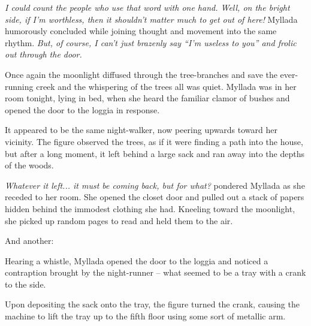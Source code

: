 \emph{I could count the people who use that word with one hand. Well, on the bright side, if I'm worthless, then it shouldn't matter much to get out of here!} Myllada humorously concluded while joining thought and movement into the same rhythm. \emph{But, of course, I can't just brazenly say ``I'm useless to you'' and frolic out through the door.}

\centeredstars

Once again the moonlight diffused through the tree-branches and save the ever-running creek and the whispering of the trees all was quiet. Myllada was in her room tonight, lying in bed, when she heard the familiar clamor of bushes and opened the door to the loggia in response.

It appeared to be the same night-walker, now peering upwards toward her vicinity. The figure observed the trees, as if it were finding a path into the house, but after a long moment, it left behind a large sack and ran away into the depths of the woods.

\emph{Whatever it left... it must be coming back, but for what?} pondered Myllada as she receded to her room. She opened the closet door and pulled out a stack of papers hidden behind the immodest clothing she had. Kneeling toward the moonlight, she picked up random pages to read and held them to the air.


And another:


Hearing a whistle, Myllada opened the door to the loggia and noticed a contraption brought by the night-runner -- what seemed to be a tray with a crank to the side.

Upon depositing the sack onto the tray, the figure turned the crank, causing the machine to lift the tray up to the fifth floor using some sort of metallic arm.

